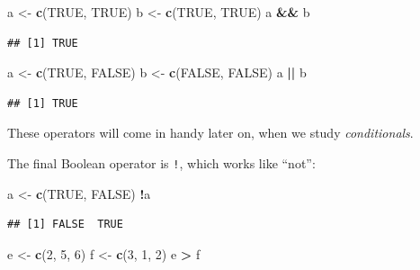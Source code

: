 \documentclass[]{book}
\makeatletter
\newenvironment{Shaded}{\begin{snugshade}}{\end{snugshade}}
\newcommand{\KeywordTok}[1]{\textcolor[rgb]{0.13,0.29,0.53}{\textbf{#1}}}
\newcommand{\DecValTok}[1]{\textcolor[rgb]{0.00,0.00,0.81}{#1}}
\newcommand{\StringTok}[1]{\textcolor[rgb]{0.31,0.60,0.02}{#1}}
\newcommand{\OtherTok}[1]{\textcolor[rgb]{0.56,0.35,0.01}{#1}}
\newcommand{\OperatorTok}[1]{\textcolor[rgb]{0.81,0.36,0.00}{\textbf{#1}}}
\newcommand{\NormalTok}[1]{#1}
\newenvironment{kframe}{%
\medskip{}
\setlength{\fboxsep}{.8em}
 \def\at@end@of@kframe{}%
 \ifinner\ifhmode%
  \def\at@end@of@kframe{\end{minipage}}%
  \begin{minipage}{\columnwidth}%
 \fi\fi%
 \def\FrameCommand##1{\hskip\@totalleftmargin \hskip-\fboxsep
 \colorbox{shadecolor}{##1}\hskip-\fboxsep
     \hskip-\linewidth \hskip-\@totalleftmargin \hskip\columnwidth}%
 \MakeFramed {\advance\hsize-\width
   \@totalleftmargin\z@ \linewidth\hsize
   \@setminipage}}%
 {\par\unskip\endMakeFramed%
 \at@end@of@kframe}
\renewenvironment{Shaded}{\begin{kframe}}{\end{kframe}}
\theoremstyle{definition}
\theoremstyle{definition}
\theoremstyle{definition}
\theoremstyle{remark}
\makeatother
\begin{document}
\begin{Shaded}
\begin{Highlighting}[]
\NormalTok{a <-}\StringTok{ }\KeywordTok{c}\NormalTok{(}\OtherTok{TRUE}\NormalTok{, }\OtherTok{TRUE}\NormalTok{)}
\NormalTok{b <-}\StringTok{ }\KeywordTok{c}\NormalTok{(}\OtherTok{TRUE}\NormalTok{, }\OtherTok{TRUE}\NormalTok{)}
\NormalTok{a }\OperatorTok{&&}\StringTok{ }\NormalTok{b}
\end{Highlighting}
\end{Shaded}

\begin{verbatim}
## [1] TRUE
\end{verbatim}

\begin{Shaded}
\begin{Highlighting}[]
\NormalTok{a <-}\StringTok{ }\KeywordTok{c}\NormalTok{(}\OtherTok{TRUE}\NormalTok{, }\OtherTok{FALSE}\NormalTok{)}
\NormalTok{b <-}\StringTok{ }\KeywordTok{c}\NormalTok{(}\OtherTok{FALSE}\NormalTok{, }\OtherTok{FALSE}\NormalTok{)}
\NormalTok{a }\OperatorTok{||}\StringTok{ }\NormalTok{b}
\end{Highlighting}
\end{Shaded}

\begin{verbatim}
## [1] TRUE
\end{verbatim}

These operators will come in handy later on, when we study
\emph{conditionals}.

The final Boolean operator is \texttt{!}, which works like ``not'':

\begin{Shaded}
\begin{Highlighting}[]
\NormalTok{a <-}\StringTok{ }\KeywordTok{c}\NormalTok{(}\OtherTok{TRUE}\NormalTok{, }\OtherTok{FALSE}\NormalTok{)}
\OperatorTok{!}\NormalTok{a}
\end{Highlighting}
\end{Shaded}

\begin{verbatim}
## [1] FALSE  TRUE
\end{verbatim}

\begin{Shaded}
\begin{Highlighting}[]
\NormalTok{e <-}\StringTok{ }\KeywordTok{c}\NormalTok{(}\DecValTok{2}\NormalTok{, }\DecValTok{5}\NormalTok{, }\DecValTok{6}\NormalTok{)}
\NormalTok{f <-}\StringTok{  }\KeywordTok{c}\NormalTok{(}\DecValTok{3}\NormalTok{, }\DecValTok{1}\NormalTok{, }\DecValTok{2}\NormalTok{)}
\NormalTok{e }\OperatorTok{>}\StringTok{ }\NormalTok{f}
\end{Highlighting}
\end{Shaded}
\end{document}
